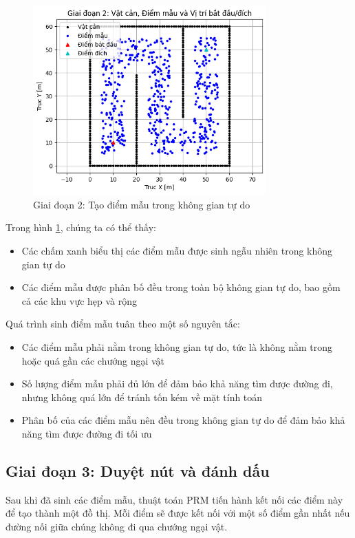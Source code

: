\documentclass[12pt,a4paper,openany,oneside]{report}
\begin{document}
\begin{figure}[H]
    \centering
    \includegraphics[width=0.8\textwidth]{giai_doan_2}
    \caption{Giai đoạn 2: Tạo điểm mẫu trong không gian tự do}
    \label{fig:stage2}
\end{figure}

Trong hình \ref{fig:stage2}, chúng ta có thể thấy:
\begin{itemize}
    \item Các chấm xanh biểu thị các điểm mẫu được sinh ngẫu nhiên trong không gian tự do
    \item Các điểm mẫu được phân bố đều trong toàn bộ không gian tự do, bao gồm cả các khu vực hẹp và rộng
\end{itemize}

Quá trình sinh điểm mẫu tuân theo một số nguyên tắc:
\begin{itemize}
    \item Các điểm mẫu phải nằm trong không gian tự do, tức là không nằm trong hoặc quá gần các chướng ngại vật
    \item Số lượng điểm mẫu phải đủ lớn để đảm bảo khả năng tìm được đường đi, nhưng không quá lớn để tránh tốn kém về mặt tính toán
    \item Phân bố của các điểm mẫu nên đều trong không gian tự do để đảm bảo khả năng tìm được đường đi tối ưu
\end{itemize}

\subsection{Giai đoạn 3: Duyệt nút và đánh dấu}

Sau khi đã sinh các điểm mẫu, thuật toán PRM tiến hành kết nối các điểm này để tạo thành một đồ thị. Mỗi điểm sẽ được kết nối với một số điểm gần nhất nếu đường nối giữa chúng không đi qua chướng ngại vật.
\end{document}
